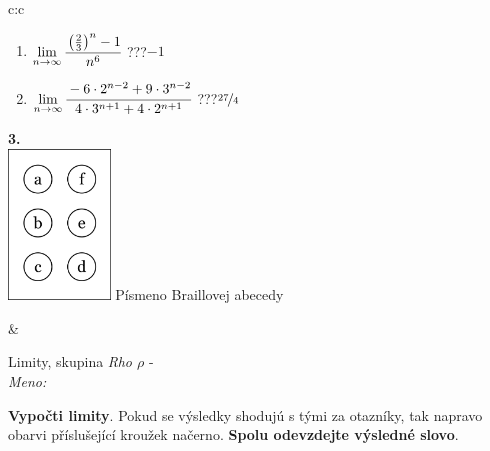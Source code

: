 \documentclass[10pt]{report}
\begin{document}
\begin{tabular}{c:c}
\begin{minipage}[c][104.5mm][t]{0.5\linewidth}
\begin{center}
\begin{minipage}{0.79\linewidth}
\begin{center}
\begin{varwidth}{\linewidth}
\begin{enumerate}
\item $\lim\limits_{n\to\infty}\cfrac{\left(\frac{2}{3}\right)^n -1}{n^{6}}$\quad \dotfill\; ???\;\dotfill \quad $-1$
\item $\lim\limits_{n\to\infty}\cfrac{-6\cdot 2^{n-2}+9\cdot 3^{n-2}}{4\cdot 3^{n+1}+4\cdot 2^{n+1}}$\quad \dotfill\; ???\;\dotfill \quad $\nicefrac{27}{4}$
\end{enumerate}
\end{varwidth}
\end{center}
\end{minipage}
\begin{minipage}{0.20\linewidth}
\begin{center}
{\Huge\bfseries 3.} \\[2mm]
\includegraphics[height=40mm]{../images/braille.png}
{\small Písmeno Braillovej abecedy}
\end{center}
\end{minipage}
\end{center}
\end{minipage}
&
\begin{minipage}[c][104.5mm][t]{0.5\linewidth}
\begin{center}
\vspace{7mm}
{\huge Limity, skupina \textit{Rho $\rho$} -}\\[5mm]
\textit{Meno:}\phantom{xxxxxxxxxxxxxxxxxxxxxxxxxxxxxxxxxxxxxxxxxxxxxxxxxxxxxxxxxxxxxxxxx}\\[5mm]
\begin{minipage}{0.95\linewidth}
\begin{center}
\textbf{Vypočti limity}. Pokud se výsledky shodujú s tými za otazníky, tak napravo\\obarvi příslušející kroužek načerno. \textbf{Spolu odevzdejte výsledné slovo}.
\end{center}
\end{minipage}
\\[1mm]
\begin{minipage}{0.79\linewidth}
\begin{center}
\begin{varwidth}{\linewidth}

\end{varwidth}
\end{center}
\end{minipage}
\end{center}
\end{minipage}
\end{tabular}
\end{document}
